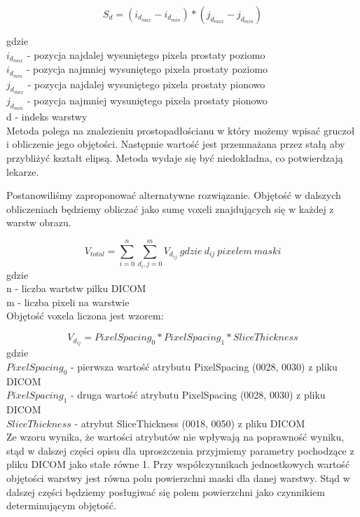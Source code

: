 \documentclass[a4paper,11pt,twoside]{report}
\theoremstyle{definition}
\begin{document}
\[S_d = (i_{d_{max}} - i_{d_{min}}) * (j_{d_{max}} - j_{d_{min}})\] 

gdzie \\
\(i_{d_{max}}\) - pozycja najdalej wysuniętego pixela prostaty poziomo \\
\(i_{d_{min}}\) - pozycja najmniej wysuniętego pixela prostaty poziomo \\
\(j_{d_{max}}\) - pozycja najdalej wysuniętego pixela prostaty pionowo \\
\(j_{d_{min}}\) - pozycja najmniej wysuniętego pixela prostaty pionowo \\
d - indeks warstwy \\

Metoda polega na znalezieniu prostopadłościanu w który możemy wpisać gruczoł i obliczenie jego objętości. Następnie wartość jest przemnażana przez stałą aby przybliżyć kształt elipsą. Metoda wydaje się być niedokładna, co potwierdzają lekarze. 
\par
Postanowiliśmy zaproponować alternatywne rozwiązanie. Objętość w dalszych obliczeniach będziemy obliczać jako sumę voxeli znajdujących się w każdej z warstw obrazu. 

\[ V_{total} = \sum_{i=0}^{n} \sum_{d_i, j=0}^{m} V_{d_{ij}} \ gdzie\ d_{ij}\ pixelem\ maski \]
gdzie \\
n - liczba wartstw pilku DICOM \\
m - liczba pixeli na warstwie \\

Objętość voxela liczona jest wzorem:

\[ V_{d_{ij}} = PixelSpacing_0 * PixelSpacing_1 * SliceThickness\]
gdzie \\
\(PixelSpacing_0\) - pierwsza wartość atrybutu PixelSpacing (0028, 0030) z pliku DICOM \\
\(PixelSpacing_1\)  - druga wartość atrybutu PixelSpacing (0028, 0030) z pliku DICOM \\
\(SliceThickness\) - atrybut SliceThickness (0018, 0050) z pliku DICOM \\

Ze wzoru wynika, że wartości atrybutów nie wpływają na poprawność wyniku, stąd w dalszej części opisu dla uproszczenia przyjmiemy parametry pochodzące z pliku DICOM jako stałe równe 1. Przy współczynnikach jednostkowych wartość objętości warstwy jest równa polu powierzchni maski dla danej warstwy. Stąd w dalszej części będziemy posługiwać się polem powierzchni jako czynnikiem determinującym objętość.
\end{document}
